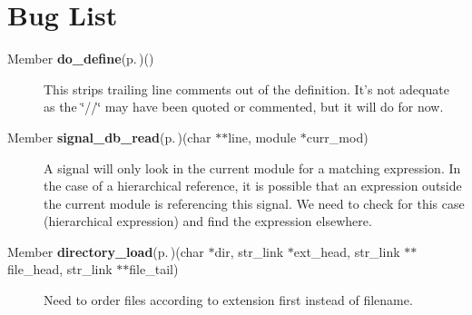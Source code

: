 \section{Bug List}\label{bug}
\label{_bug000001}
 \begin{description}
\item[Member {\bf do\_\-define}{\rm (p.\,\pageref{pplexer_8c_a134})}() ]This strips trailing line comments out of the definition. It's not adequate as the \char`\"{}//\char`\"{} may have been quoted or commented, but it will do for now. \end{description}


\label{_bug000002}
 \begin{description}
\item[Member {\bf signal\_\-db\_\-read}{\rm (p.\,\pageref{signal_8c_a5})}(char $\ast$$\ast$line, module $\ast$curr\_\-mod) ]A signal will only look in the current module for a matching expression. In the case of a hierarchical reference, it is possible that an expression outside the current module is referencing this signal. We need to check for this case (hierarchical expression) and find the expression elsewhere. \end{description}


\label{_bug000003}
 \begin{description}
\item[Member {\bf directory\_\-load}{\rm (p.\,\pageref{util_8c_a11})}(char $\ast$dir, str\_\-link $\ast$ext\_\-head, str\_\-link $\ast$$\ast$file\_\-head, str\_\-link $\ast$$\ast$file\_\-tail) ]Need to order files according to extension first instead of filename. \end{description}
